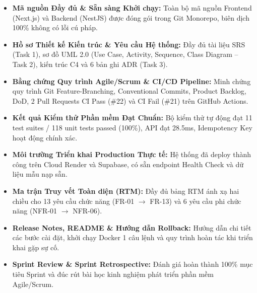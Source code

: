 \documentclass[11pt,a4paper]{article}
\begin{document}
\begin{itemize}[leftmargin=*,topsep=2pt,itemsep=1pt,parsep=0pt]
\small
    \item[$\checkmark$] \textbf{Mã nguồn Đầy đủ \& Sẵn sàng Khởi chạy:} Toàn bộ mã nguồn Frontend (Next.js) và Backend (NestJS) được đóng gói trong Git Monorepo, biên dịch 100\% không có lỗi cú pháp.
    \item[$\checkmark$] \textbf{Hồ sơ Thiết kế Kiến trúc \& Yêu cầu Hệ thống:} Đầy đủ tài liệu SRS (Task 1), sơ đồ UML 2.0 (Use Case, Activity, Sequence, Class Diagram -- Task 2), kiến trúc C4 và 6 bản ghi ADR (Task 3).
    \item[$\checkmark$] \textbf{Bằng chứng Quy trình Agile/Scrum \& CI/CD Pipeline:} Minh chứng quy trình Git Feature-Branching, Conventional Commits, Product Backlog, DoD, 2 Pull Requests CI Pass (\#22) và CI Fail (\#21) trên GitHub Actions.
    \item[$\checkmark$] \textbf{Kết quả Kiểm thử Phần mềm Đạt Chuẩn:} Bộ kiểm thử tự động đạt 11 test suites / 118 unit tests passed (100\%), API đạt 28.5ms, Idempotency Key hoạt động chính xác.
    \item[$\checkmark$] \textbf{Môi trường Triển khai Production Thực tế:} Hệ thống đã deploy thành công trên Cloud Render và Supabase, có sẵn endpoint Health Check và dữ liệu mẫu nạp sẵn.
    \item[$\checkmark$] \textbf{Ma trận Truy vết Toàn diện (RTM):} Đầy đủ bảng RTM ánh xạ hai chiều cho 13 yêu cầu chức năng (FR-01 $\rightarrow$ FR-13) và 6 yêu cầu phi chức năng (NFR-01 $\rightarrow$ NFR-06).
    \item[$\checkmark$] \textbf{Release Notes, README \& Hướng dẫn Rollback:} Hướng dẫn chi tiết các bước cài đặt, khởi chạy Docker 1 câu lệnh và quy trình hoàn tác khi triển khai gặp sự cố.
    \item[$\checkmark$] \textbf{Sprint Review \& Sprint Retrospective:} Đánh giá hoàn thành 100\% mục tiêu Sprint và đúc rút bài học kinh nghiệm phát triển phần mềm Agile/Scrum.
\end{itemize}
\end{document}
